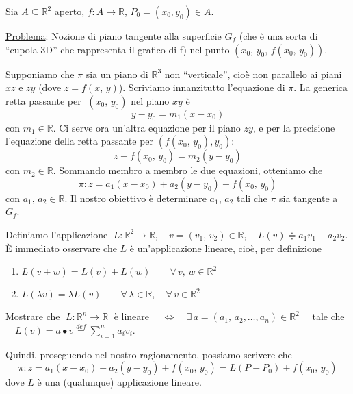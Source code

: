 Sia $A \subseteq \mathbb{R}^2$ aperto, $f:A \longrightarrow \mathbb{R}$, $P_0=(x_0,y_0) \in A$.

\begin{center}
\def\svgwidth{12cm}

\end{center}

\underline{Problema}: Nozione di piano tangente alla superficie $G_f$ (che è una sorta di ``cupola 3D'' che rappresenta il grafico di f) nel punto $(x_0,\,y_0,\,f(x_0,\,y_0))$.

Supponiamo che $\pi$ sia un piano di $\mathbb{R}^3$ non ``verticale'', cioè non parallelo ai piani $xz$ e $zy$ (dove $z=f(x,\,y)$).
Scriviamo innanzitutto l'equazione di $\pi$. La generica retta passante per $\; (x_0,\,y_0)$ nel piano $xy$ è
$$y-y_0=m_1(x-x_0)$$
con $m_1 \in \mathbb{R}$.
Ci serve ora un'altra equazione per il piano $zy$, e per la precisione l'equazione della retta passante per $(f(x_0,\,y_0),y_0)$:
$$z - f(x_0,\,y_0) = m_2(y-y_0)$$
con $m_2 \in \mathbb{R}$. Sommando membro a membro le due equazioni, otteniamo che
$$\pi : z = a_1(x-x_0) + a_2(y-y_0) + f(x_0,\,y_0)$$
con $a_1,\,a_2 \in \mathbb{R}$.
Il nostro obiettivo è determinare $a_1,\,a_2$ tali che $\pi$ sia tangente a $G_f$.

Definiamo l'applicazione $\; L:\mathbb{R}^2 \longrightarrow \mathbb{R}, \quad v=(v_1,\,v_2) \in \mathbb{R}, \quad L(v) \doteqdot a_1v_1 + a_2v_2$. \`E immediato osservare che $L$ è un'applicazione lineare, cioè, per definizione
\begin{enumerate}[labelindent=\parindent,leftmargin=*,label=\textnormal{(Lin\arabic*)},start=1]
\item $L(v+w)=L(v)+L(w) \qquad \forall \, v,\,w \in \mathbb{R}^2$
\item $L(\lambda v) = \lambda L(v) \qquad \forall \, \lambda \in \mathbb{R}, \quad \forall \, v \in \mathbb{R}^2$
\end{enumerate}

\begin{exer}
Mostrare che $\; L:\mathbb{R}^n \longrightarrow \mathbb{R} \;$ è lineare $\quad \Longleftrightarrow \quad \exists \, a=(a_1,\,a_2,\ldots,a_n) \in \mathbb{R}^2 \quad$ tale che $\quad L(v) = a \bullet v \overset{def}{=} \displaystyle \sum_{i=1}^n a_i v_i$.
\end{exer}

Quindi, proseguendo nel nostro ragionamento, possiamo scrivere che
$$\pi : z = a_1(x-x_0) + a_2(y-y_0) + f(x_0,\,y_0) = L(P-P_0) + f(x_0,\,y_0)$$
dove $L$ è una (qualunque) applicazione lineare.

